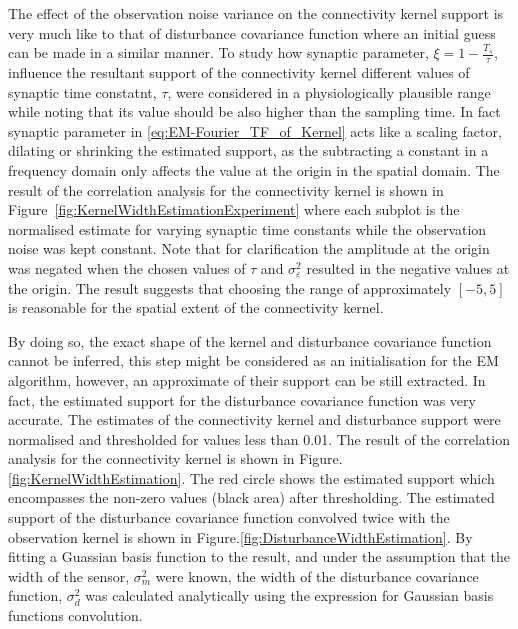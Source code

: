 \documentclass[]{article}
\begin{document}
The effect of the observation noise variance on the connectivity kernel support is very much like to that of disturbance covariance function where an initial guess can be made in a similar manner. To study how synaptic parameter, $\xi=1-\frac{ T_s}{\tau}$, influence the resultant support of the connectivity kernel different values of synaptic time constatnt, $\tau$, were considered in a physiologically plausible range while noting that its value should be also higher than the sampling time. In fact synaptic parameter in \eqref{eq:EM-Fourier_TF_of_Kernel}  acts like a scaling factor, dilating or shrinking the estimated support, as the subtracting a constant in a frequency domain only affects the value at the origin in the spatial domain. The result of the correlation analysis for the connectivity kernel is shown in Figure~\ref{fig:KernelWidthEstimationExperiment} where each subplot is the normalised  estimate for varying synaptic time constants while the observation noise was kept constant. Note that for clarification the amplitude at the origin was negated when the chosen values of $\tau$ and $\sigma^2_{\varepsilon}$ resulted in the negative values at the origin. The result suggests that choosing the range of approximately $\left[-5,5 \right] $ is reasonable for the spatial extent of the connectivity kernel.


 By doing so, the exact shape of the kernel and disturbance covariance function cannot be inferred, this step might be considered as an initialisation for the EM algorithm, however, an approximate of their support can be still extracted. In fact, the estimated support for the disturbance covariance function was very accurate. The estimates of the connectivity kernel and disturbance support were normalised and thresholded for values less than 0.01. The result of the correlation analysis for the connectivity kernel is shown in Figure.\ref{fig:KernelWidthEstimation}. The red circle shows the estimated support which encompasses the non-zero values (black area) after thresholding. The estimated support of the disturbance covariance function convolved twice with the observation kernel is shown in Figure.\ref{fig:DisturbanceWidthEstimation}. By fitting a Guassian basis function to the result, and under the assumption that the width of the sensor, $\sigma_m^2$ were known, the width of the disturbance covariance function, $\sigma_d^2$ was calculated analytically using the expression for Gaussian basis functions convolution.
\end{document}
